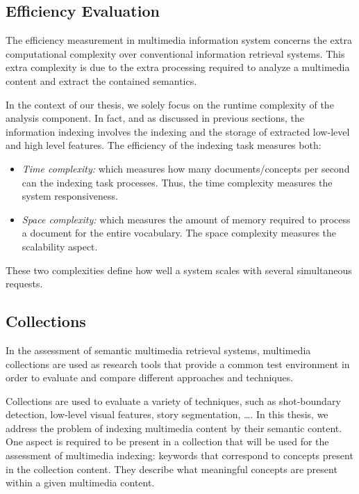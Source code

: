 		\subsection{Efficiency Evaluation}

		The efficiency measurement in multimedia information system concerns the extra computational
		complexity over conventional information retrieval systems. This extra complexity is due to 
		the extra processing required to analyze a multimedia content and extract the contained 
		semantics.

		In the context of our thesis, we solely focus on the runtime complexity of the analysis component. 
		In fact, and as discussed in previous sections, the information indexing involves the indexing and 
		the storage of extracted low-level and high level features. The efficiency of the indexing task 
		measures both:
		\begin{itemize}
			\item \textit{Time complexity:} which measures how many documents/concepts per second 
			can the indexing task processes. Thus, the time complexity measures the system responsiveness.

			\item \textit{Space complexity:} which measures the amount of memory required to process a document 
			for the entire vocabulary. The space complexity measures the scalability aspect.
		\end{itemize}
		These two complexities define how well a system scales with several simultaneous requests.


		\subsection{Collections}

		In the assessment of semantic multimedia retrieval systems, multimedia collections 
		are used as research tools that provide a common test environment in order to evaluate and 
		compare different approaches and techniques. 

		Collections are used to evaluate a variety of techniques, such as shot-boundary detection, 
		low-level visual features, story segmentation, \dots{}. In this thesis, we address the problem of 
		indexing multimedia content by their semantic content. One aspect is required to be present in a 
		collection that will be used for the assessment of multimedia indexing: keywords that correspond 
		to concepts present in the collection content. They describe what meaningful concepts are present 
		within a given multimedia content.
	
